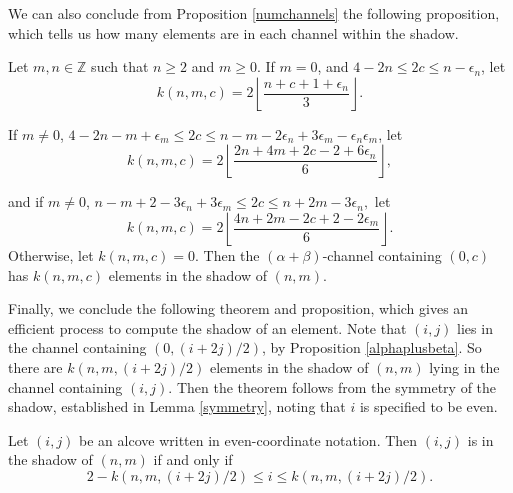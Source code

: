 \documentclass[11pt]{article}
\begin{document}
We can also conclude from Proposition \ref{numchannels} the following proposition, which tells us how many elements are in each channel within the shadow. 

\begin{proposition}
    Let $m,n\in\mathbb{Z}$ such that $n\geq 2$ and $m\geq 0$. If $m=0$, and $4-2n\leq 2c\leq  n-\epsilon_n$, let 
    \[k(n,m,c)=
2\left\lfloor
\dfrac{n+c+1+\epsilon_n}{3}
\right\rfloor.
\]
    
If $m\neq 0$, $4-2n-m+\epsilon_m
\leq 2c \leq
n-m-2\epsilon_n+3\epsilon_m
-\epsilon_n\epsilon_m$, let \[
k(n,m,c)=
2\left\lfloor
\dfrac{
2n+4m+2c-2+6\epsilon_n
}{6}
\right\rfloor,\]

and if $m\neq 0$, $n-m+2-3\epsilon_n+3\epsilon_m
\leq 2c \leq
n+2m-3\epsilon_n,$ let
\[k(n,m,c)=
2\left\lfloor
\dfrac{
4n+2m-2c+2-2\epsilon_m
}{6}
\right\rfloor.\]
Otherwise, let $k(n,m,c)=0$. Then the $(\alpha+\beta)$-channel containing $(0,c)$ has  $k(n,m,c)$ elements in the shadow of $(n,m)$. 


\end{proposition}
Finally, we conclude the following theorem and proposition, which gives an efficient process to compute the shadow of an element. Note that $(i,j)$ lies in the channel containing $(0,(i+2j)/2)$, by Proposition \ref{alphaplusbeta}. So there are $k(n,m,(i+2j)/2)$ elements in the shadow of $(n,m)$ lying in the channel containing $(i,j)$. Then the theorem follows from the symmetry of the shadow, established in Lemma \ref{symmetry}, noting that $i$ is specified to be even.
\begin{theorem}\label{shadowscondition}



Let $(i,j)$ be an alcove written in even-coordinate notation. Then $(i,j)$ is in the shadow of $(n,m)$ if and only if 
    \[2-k(n,m,({i+2j})/{2})\leq i \leq k(n,m,({i+2j})/{2}).\]

\end{theorem}
\end{document}

